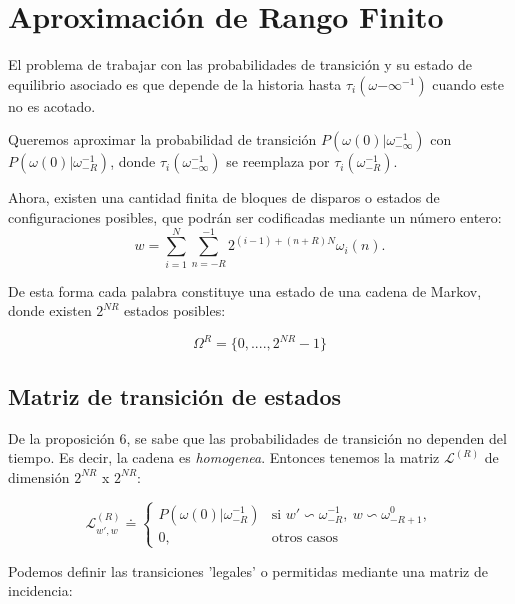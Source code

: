 \section{Aproximación de Rango Finito}

El problema de trabajar con las probabilidades de transición y su estado de equilibrio asociado es que depende de la historia hasta $\tau_i(\omega{-\infty}^{-1})$ cuando este no es acotado.

Queremos aproximar la probabilidad de transición $P(\omega(0)|\omega_{-\infty}^{-1})$ con $P(\omega(0)|\omega_{-R}^{-1})$, donde $\tau_i(\omega_{-\infty}^{-1})$ se reemplaza por $\tau_i(\omega_{-R}^{-1})$. 

Ahora, existen una cantidad finita de bloques de disparos o estados de configuraciones posibles, que podrán ser codificadas mediante un número entero:
\begin{equation}
    w=\sum_{i=1}^N \sum_{n=-R}^{-1} 2^{(i-1)+(n+R)N} \omega_i (n). \label{eqCode_w}
\end{equation}

De esta forma cada palabra constituye una estado de una cadena de Markov, donde existen $2^{NR}$ estados posibles:

\begin{equation}
    \Omega^R = \{ 0,....,2^{NR}-1\}
\end{equation}

\subsection{Matriz de transición de estados}

De la proposición 6, se sabe que las probabilidades de transición no dependen del tiempo. Es decir, la cadena es \textit{homogenea}. Entonces tenemos la matriz $\mathcal{L}^{(R)}$ de dimensión $2^{NR}$ x $2^{NR}$:

\begin{equation}
    \mathcal{L}^{(R)}_{w',w}  \doteq    \left\{ \begin{array}{ll}
                            P(\omega(0)|\omega^{-1}_{-R}) & \text{si } w' \backsim \omega^{-1}_{-R},~ w \backsim \omega^{0}_{-R+1}, \\ 
                            0,           & \text{otros casos}
                            \end{array}\right.
    \label{matriz_L}
\end{equation}

Podemos definir las transiciones 'legales' o permitidas mediante una matriz de incidencia:

